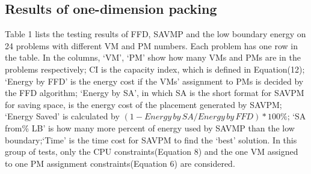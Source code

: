 \documentclass[10pt, conference, compsocconf]{IEEEtran}
\begin{document}
\subsection{Results of one-dimension packing}
Table 1 lists the testing results of FFD, SAVMP and the low boundary energy on
24 problems with different VM and PM numbers. Each problem has one row in the
table.  In the columns, `VM', `PM' show how many VMs and PMs are in the problems
respectively; CI is the capacity index, which is defined in Equation(12);
`Energy by FFD' is the energy cost if the VMs' assignment to PMs is decided by
the FFD algorithm; `Energy by SA', in which SA is the short format for SAVPM for
saving space, is the energy cost of the placement generated by SAVPM; `Energy
Saved' is calculated by $(1 - Energy\, by\, SA/Energy\, by\, FFD)*100\%$; `SA
from\% LB' is how many more percent of energy used by SAVMP than the low
boundary;`Time' is the time cost for SAVPM to find the `best' solution.
In this group of tests, only the CPU constraints(Equation 8) and the one VM
assigned to one PM assignment constraints(Equation 6) are considered. 
\end{document}
